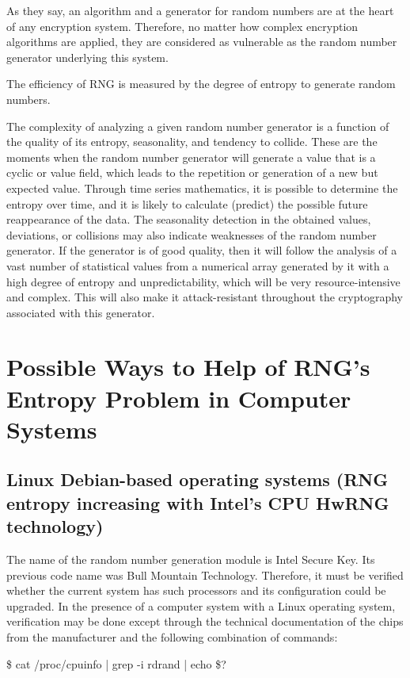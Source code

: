 \documentclass[runningheads]{llncs}
\begin{document}
As they say, an algorithm and a generator for random numbers are at the heart of any encryption system. Therefore, no matter how complex encryption algorithms are applied, they are considered as vulnerable as the random number generator underlying this system.

The efficiency of RNG is measured by the degree of entropy to generate random numbers.

The complexity of analyzing a given random number generator is a function of the quality of its entropy, seasonality, and tendency to collide. These are the moments when the random number generator will generate a value that is a cyclic or value field, which leads to the repetition or generation of a new but expected value. Through time series mathematics, it is possible to determine the entropy over time, and it is likely to calculate (predict) the possible future reappearance of the data. The seasonality detection in the obtained values, deviations, or collisions may also indicate weaknesses of the random number generator. If the generator is of good quality, then it will follow the analysis of a vast number of statistical values from a numerical array generated by it with a high degree of entropy and unpredictability, which will be very resource-intensive and complex. This will also make it attack-resistant throughout the cryptography associated with this generator.

\section{Possible Ways to Help of RNG’s Entropy Problem in Computer Systems}
\label{sec:5}

\subsection{Linux Debian-based operating systems (RNG entropy increasing with Intel’s CPU HwRNG technology)}
\label{sub-sec:5-1}

The name of the random number generation module is Intel Secure Key. Its previous code name was Bull Mountain Technology. Therefore, it must be verified whether the current system has such processors and its configuration could be upgraded. In the presence of a computer system with a Linux operating system, verification may be done except through the technical documentation of the chips from the manufacturer and the following combination of commands:

\$ cat /proc/cpuinfo | grep -i rdrand | echo \$?
\end{document}
